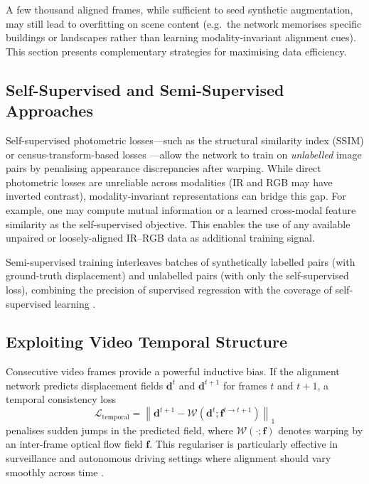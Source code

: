 A few thousand aligned frames, while sufficient to seed synthetic augmentation,
may still lead to overfitting on scene content (e.g.\ the network memorises
specific buildings or landscapes rather than learning modality-invariant
alignment cues).  This section presents complementary strategies for
maximising data efficiency.

\subsection{Self-Supervised and Semi-Supervised Approaches}
\label{subsec:self_supervised}

Self-supervised photometric losses---such as the structural similarity index
(SSIM) or census-transform-based losses
\cite{meister2018unflow, jonschkowski2020matters}---allow the network to train
on \emph{unlabelled} image pairs by penalising appearance discrepancies after
warping.  While direct photometric losses are unreliable across modalities
(IR and RGB may have inverted contrast), modality-invariant representations
can bridge this gap.  For example, one may compute mutual information
\cite{viola1997alignment} or a learned cross-modal feature similarity
\cite{czolbe2021semantic} as the self-supervised objective.  This enables the
use of any available unpaired or loosely-aligned IR--RGB data as additional
training signal.

Semi-supervised training interleaves batches of synthetically labelled pairs
(with ground-truth displacement) and unlabelled pairs (with only the
self-supervised loss), combining the precision of supervised regression with
the coverage of self-supervised learning \cite{lai2017semi_flow}.

\subsection{Exploiting Video Temporal Structure}
\label{subsec:temporal_structure}

Consecutive video frames provide a powerful inductive bias.  If the alignment
network predicts displacement fields $\mathbf{d}^{t}$ and
$\mathbf{d}^{t+1}$ for frames $t$ and $t+1$, a temporal consistency loss
\begin{equation}
    \mathcal{L}_{\mathrm{temporal}} =
    \left\| \mathbf{d}^{t+1} - \mathcal{W}(\mathbf{d}^{t}; \mathbf{f}^{t \to t+1}) \right\|_1
    \label{eq:temporal_loss}
\end{equation}
penalises sudden jumps in the predicted field, where
$\mathcal{W}(\cdot; \mathbf{f})$ denotes warping by an inter-frame optical
flow field $\mathbf{f}$.  This regulariser is particularly effective in
surveillance and autonomous driving settings where alignment should vary
smoothly across time \cite{lai2017semi_flow}.

